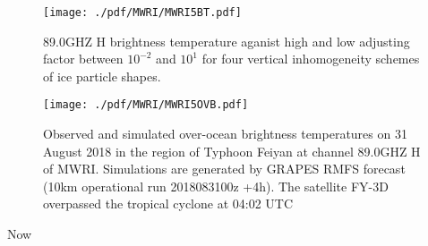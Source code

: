 \begin{figure}[hbtp] 
\centering
\texttt{[image: ./pdf/MWRI/MWRI5BT.pdf]}
\caption{89.0GHZ H brightness temperature aganist high and low adjusting factor between $10^{-2}$ and $10^{1}$ for four vertical 
inhomogeneity schemes of ice particle shapes.}
\label{fig:MWRI5BT}
\end{figure}

\begin{figure}[hbtp] 
\centering
\texttt{[image: ./pdf/MWRI/MWRI5OVB.pdf]}
\caption{Observed and simulated over-ocean brightness temperatures on 31 August 2018 in the region of Typhoon Feiyan at channel 89.0GHZ H of MWRI.
Simulations are generated by GRAPES RMFS forecast (10km operational run 2018083100z +4h). The satellite FY-3D overpassed the
tropical cyclone at 04:02 UTC}
\label{subfig:MWRI5OVB}
\end{figure}

Now